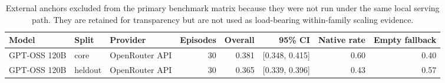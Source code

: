\begin{table}[t]
  \centering
  \scriptsize
  \setlength{\tabcolsep}{4pt}
  \begin{tabular}{lllrrrrr}
    \toprule
    Model & Split & Provider & Episodes & Overall & 95\% CI & Native rate & Empty fallback \\
    \midrule
    GPT-OSS 120B & core & OpenRouter API & 30 & 0.381 & [0.348, 0.415] & 0.60 & 0.40 \\
    GPT-OSS 120B & heldout & OpenRouter API & 30 & 0.365 & [0.339, 0.396] & 0.43 & 0.57 \\
    \bottomrule
  \end{tabular}
  \caption{External anchors excluded from the primary benchmark matrix because
  they were not run under the same local serving path. They are retained for
  transparency but are not used as load-bearing within-family scaling evidence.}
  \label{tab:externalanchors}
\end{table}
